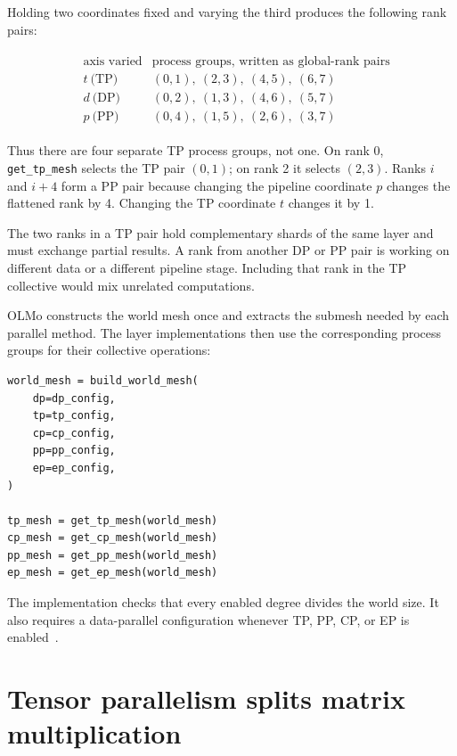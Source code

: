 \documentclass[11pt]{article}
\begin{document}
Holding two coordinates fixed and varying the third produces the following
rank pairs:

\begin{equation}
\begin{split}
&\begin{array}{c|c}
\text{axis varied} & \text{process groups, written as global-rank pairs}\\ \hline
t\ \text{(TP)} & (0,1),\ (2,3),\ (4,5),\ (6,7)\\
d\ \text{(DP)} & (0,2),\ (1,3),\ (4,6),\ (5,7)\\
p\ \text{(PP)} & (0,4),\ (1,5),\ (2,6),\ (3,7)
\end{array}
\end{split}
\end{equation}

Thus there are four separate TP process groups, not one.  On rank 0,
\texttt{get\_tp\_mesh} selects the TP pair \((0,1)\); on rank 2 it selects
\((2,3)\).  Ranks \(i\) and \(i+4\) form a PP pair because changing the
pipeline coordinate \(p\) changes the flattened rank by 4.  Changing the TP
coordinate \(t\) changes it by 1.

The two ranks in a TP pair hold complementary shards of the same layer and
must exchange partial results.  A rank from another DP or PP pair is working
on different data or a different pipeline stage.  Including that rank in the
TP collective would mix unrelated computations.

OLMo constructs the world mesh once and extracts the submesh needed by each
parallel method.  The layer implementations then use the corresponding
process groups for their collective operations:

\begin{lstlisting}[basicstyle=\ttfamily\footnotesize]
world_mesh = build_world_mesh(
    dp=dp_config,
    tp=tp_config,
    cp=cp_config,
    pp=pp_config,
    ep=ep_config,
)

tp_mesh = get_tp_mesh(world_mesh)
cp_mesh = get_cp_mesh(world_mesh)
pp_mesh = get_pp_mesh(world_mesh)
ep_mesh = get_ep_mesh(world_mesh)
\end{lstlisting}

The implementation checks that every enabled degree divides the world size.
It also requires a data-parallel configuration whenever TP, PP, CP, or EP is
enabled~\cite{olmo-world-mesh}.

\section{Tensor parallelism splits matrix multiplication}
\end{document}
